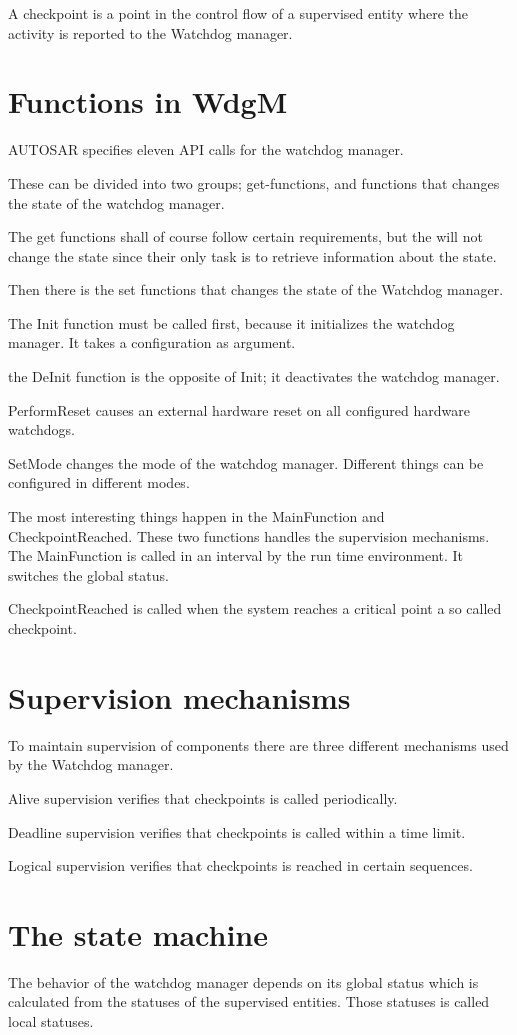 \documentclass[a4paper]{article}
\begin{document}
A checkpoint is a point in the control flow of a supervised entity
where the activity is reported to the Watchdog manager.

\section{Functions in WdgM}
AUTOSAR specifies eleven API calls for the watchdog manager.

These can be divided into two groups; get-functions, and functions
that changes the state of the watchdog manager.

The get functions shall of course follow certain requirements, but the
will not change the state since their only task is to retrieve
information about the state.

Then there is the set functions that changes the state of the Watchdog
manager.

The Init function must be called first, because it initializes the
watchdog manager. It takes a configuration as argument.

the DeInit function is the opposite of Init; it deactivates the
watchdog manager.

PerformReset causes an external hardware reset on all configured
hardware watchdogs.

SetMode changes the mode of the watchdog manager. Different things can
be configured in different modes.

The most interesting things happen in the MainFunction and
CheckpointReached. These two functions handles the supervision mechanisms.
The MainFunction is called in an interval by the run time environment.
It switches the global status.

CheckpointReached is called when the system reaches a critical point a
so called checkpoint.

\section{Supervision mechanisms}
To maintain supervision of components there are three different
mechanisms used by the Watchdog manager.

Alive supervision verifies that checkpoints is called periodically.

Deadline supervision verifies that checkpoints is called within a time
limit.

Logical supervision verifies that checkpoints is reached in certain sequences.

\section{The state machine}
The behavior of the watchdog manager depends on its global status
which is calculated from the statuses of the supervised
entities. Those statuses is called local statuses.
\end{document}
